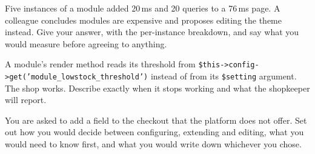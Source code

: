 \begin{checkpoint}
\begin{tightnum}
  \item Five instances of a module added 20\,ms and 20 queries to a 76\,ms
        page. A colleague concludes modules are expensive and proposes editing
        the theme instead. Give your answer, with the per-instance breakdown,
        and say what you would measure before agreeing to anything.
  \item A module's render method reads its threshold from
        \texttt{\$this->config->get('module\_lowstock\_threshold')} instead of
        from its \texttt{\$setting} argument. The shop works. Describe exactly
        when it stops working and what the shopkeeper will report.
  \item You are asked to add a field to the checkout that the platform does not
        offer. Set out how you would decide between configuring, extending and
        editing, what you would need to know first, and what you would write
        down whichever you chose.
\end{tightnum}
\end{checkpoint}

